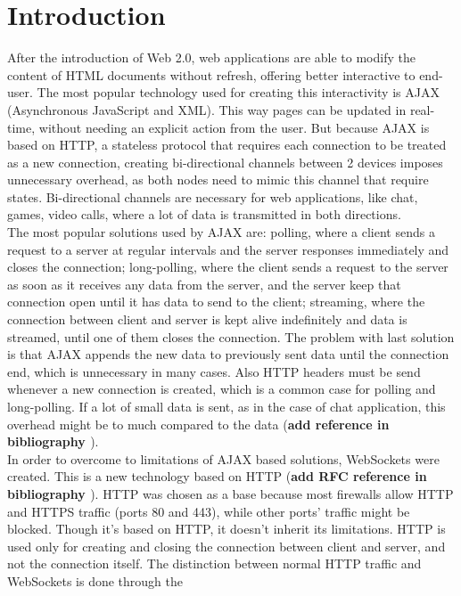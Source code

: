 \documentclass[conference]{IEEEtran}
\begin{document}
\section{Introduction}
After the introduction of Web 2.0, web applications are able to modify the
content of HTML documents without refresh, offering better interactive to end-user.
The most popular technology used for creating this interactivity is AJAX
(Asynchronous JavaScript and XML). This way pages can be updated in real-time,
without needing an explicit action from the user. But because AJAX is based on
HTTP, a stateless protocol that requires each connection to be treated as a new
connection, creating bi-directional channels between 2 devices imposes unnecessary
overhead, as both nodes need to mimic this channel that require states.
Bi-directional channels are necessary for web applications, like chat, games,
video calls, where a lot of data is transmitted in both directions.
\\
\indent
The most popular solutions used by AJAX are: polling, where a client sends
a request to a server at regular intervals and the server responses immediately
and closes the connection; long-polling, where the client sends a request to the
server as soon as it receives any data from the server, and the server keep that
connection open until it has data to send to the client; streaming, where the
connection between client and server is kept alive indeﬁnitely and data is streamed,
until one of them closes the connection. The problem with last solution is that AJAX
appends the new data to previously sent data until the connection end, which is
unnecessary in many cases. Also HTTP headers must be send whenever a new connection is
created, which is a common case for polling and long-polling. If a lot of small data
is sent, as in the case of chat application, this overhead might be to much compared
to the data (\textbf{add reference in bibliography \cite{1}}).
\\
\indent
In order to overcome to limitations of AJAX based solutions, WebSockets were created.
This is a new technology based on HTTP (\textbf{add RFC reference in bibliography \cite{2}}).
HTTP was chosen as a base because most firewalls allow HTTP and HTTPS traffic 
(ports 80 and 443), while other ports' traffic might be blocked. Though it's based on
HTTP, it doesn't inherit its limitations. HTTP is used only for creating and
closing the connection between client and server, and not the connection itself.
The distinction between normal HTTP traffic and WebSockets is done through the
\end{document}
